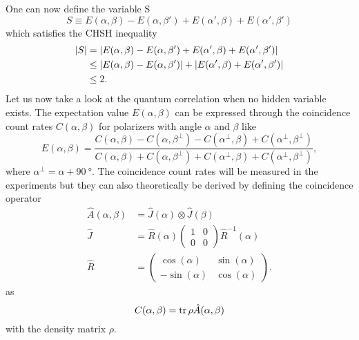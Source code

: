One can now define the variable S
\begin{equation}
S\equiv E(\alpha,\beta)-E(\alpha,\beta')+E(\alpha',\beta)+E(\alpha',\beta')
\label{eq:a:S}
\end{equation}
which satisfies the CHSH inequality
\begin{subequations}
\label{eq:a:CHSH}
\end{subequations}
\begin{align}
\abs{S}
    &=\abs{E(\alpha,\beta)-E(\alpha,\beta')+E(\alpha',\beta)+E(\alpha',\beta')}
    \label{eq:a:CHSH:1}\\
    &\leq \abs{E(\alpha,\beta)-E(\alpha,\beta')}+\abs{E(\alpha',\beta)+E(\alpha',\beta')}
    \label{eq:a:CHSH:2}\\
    &\leq 2
    \label{eq:a:CHSH:3}.
\end{align}
Let us now take a look at the quantum correlation when no hidden variable exists.
The expectation value $E(\alpha,\beta)$ can be expressed through the coincidence count rates $C(\alpha,\beta)$ for polarizers with angle $\alpha$ and $\beta$ like
\begin{equation}
E(\alpha,\beta)=\frac{C(\alpha,\beta)-C(\alpha,\beta^\perp)-C(\alpha^\perp,\beta)+C(\alpha^\perp,\beta^\perp)}{C(\alpha,\beta)+C(\alpha,\beta^\perp)+C(\alpha^\perp,\beta)+C(\alpha^\perp,\beta^\perp)},
\label{eq:a:EC}
\end{equation}
where $\alpha^\perp=\alpha+\SI{90}{\degree}$.
The coincidence count rates will be measured in the experiments but they can also theoretically be derived by defining the coincidence operator
\begin{align}
\hat A(\alpha,\beta)
    &=\hat J(\alpha)\otimes \hat J(\beta)
    \label{eq:a:A}\\
\hat J
    &=\hat R(\alpha) \begin{pmatrix}
    1&0\\0&0
    \end{pmatrix}\hat R^{-1}(\alpha)
    \label{eq:a:J}\\
\hat R
    &=\begin{pmatrix}
    \cos(\alpha)&\sin(\alpha)\\
    -\sin(\alpha)&\cos(\alpha)
    \end{pmatrix}.
    \label{eq:a:R}
\end{align}
as
\begin{equation}
C(\alpha,\beta)   = \trace{\rho \hat A(\alpha,\beta)}
\label{eq:a:CA}
\end{equation}
with the density matrix $\rho$.
